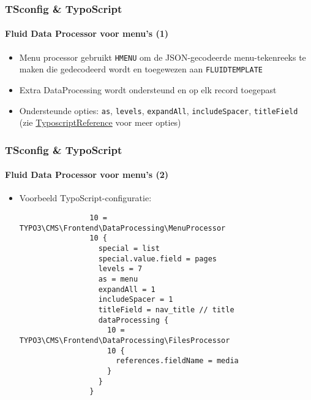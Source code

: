\begin{frame}[fragile]
	\frametitle{TSconfig \& TypoScript}
	\framesubtitle{Fluid Data Processor voor menu's (1)}

	\begin{itemize}
		\item Menu processor gebruikt \texttt{HMENU} om de JSON-gecodeerde menu-tekenreeks te maken
			die gedecodeerd wordt en toegewezen aan \texttt{FLUIDTEMPLATE}
		\item Extra DataProcessing wordt ondersteund en op elk record toegepast
		\item Ondersteunde opties: \texttt{as}, \texttt{levels}, \texttt{expandAll}, \texttt{includeSpacer},
			\texttt{titleField}
			(zie \href{https://docs.typo3.org/typo3cms/TyposcriptReference/ContentObjects/Hmenu/Index.html}{TyposcriptReference} voor meer opties)
	\end{itemize}

\end{frame}

\begin{frame}[fragile]
	\frametitle{TSconfig \& TypoScript}
	\framesubtitle{Fluid Data Processor voor menu's (2)}

	\lstset{basicstyle=\tiny\ttfamily}

	\begin{itemize}
		\item Voorbeeld TypoScript-configuratie:

			\begin{lstlisting}
				10 = TYPO3\CMS\Frontend\DataProcessing\MenuProcessor
				10 {
				  special = list
				  special.value.field = pages
				  levels = 7
				  as = menu
				  expandAll = 1
				  includeSpacer = 1
				  titleField = nav_title // title
				  dataProcessing {
				    10 = TYPO3\CMS\Frontend\DataProcessing\FilesProcessor
				    10 {
				      references.fieldName = media
				    }
				  }
				}
			\end{lstlisting}

	\end{itemize}

\end{frame}

